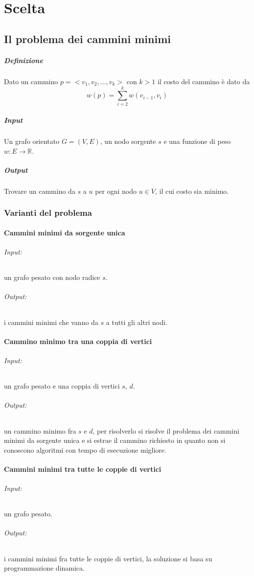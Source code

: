\chapter{Scelta}
\section{Il problema dei cammini minimi}
\paragraph{Definizione}
Dato un cammino $p=<v_1, v_2, \dots, v_k>$ con $k>1$ il costo del cammino \`e dato da $$w(p) = \sum\limits_{i =2}^k w(v_{i-1}, v_i)$$
\paragraph{Input}
Un grafo orientato $G = (V, E)$, un nodo sorgente $s$ e una funzione di peso $w: E\rightarrow \mathbb{R}$.
\paragraph{Output}
Trovare un cammino da $s$ a $u$ per ogni nodo $u\in V$, il cui costo sia minimo.
\subsection{Varianti del problema}
\subsubsection{Cammini minimi da sorgente unica}
\subparagraph{Input:} un grafo pesato con nodo radice $s$.
\subparagraph{Output:} i cammini minimi che vanno da $s$ a tutti gli altri nodi.
\subsubsection{Cammino minimo tra una coppia di vertici}
\subparagraph{Input:} un grafo pesato e una coppia di vertici $s$, $d$.
\subparagraph{Output:} un cammino minimo fra $s$ e $d$, per risolverlo si risolve il problema dei cammini minimi da sorgente unica e si estrae il cammino richiesto in quanto non si 
conoscono algoritmi con tempo di esecuzione migliore.
\subsubsection{Cammini minimi tra tutte le coppie di vertici}
\subparagraph{Input:} un grafo pesato.
\subparagraph{Output:} i cammini minimi fra tutte le coppie di vertici, la soluzione si basa su programmazione dinamica.

